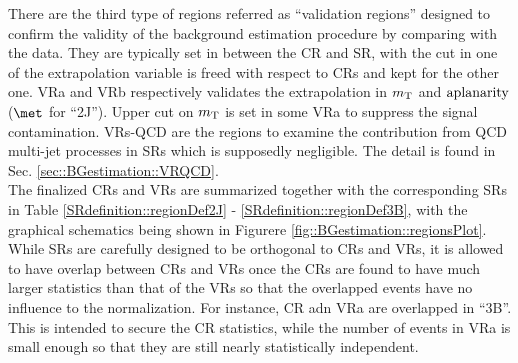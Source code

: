 There are the third type of regions referred as ``validation regions'' designed to confirm the validity of the background estimation procedure by comparing with the data. They are typically set in between the CR and SR, with the cut in one of the extrapolation variable is freed with respect to CRs and kept for the other one. VRa and VRb respectively validates the extrapolation in $m_{\mathrm{T}}$ and $\mathrm{aplanarity}$ ($\met$ for ``2J''). Upper cut on $m_{\mathrm{T}}$ is set in some VRa to suppress the signal contamination. VRs-QCD are the regions to examine the contribution from QCD multi-jet processes in SRs which is supposedly negligible. The detail is found in Sec. \ref{sec::BGestimation::VRQCD}. \\

The finalized CRs and VRs are summarized together with the corresponding SRs in Table \ref{SRdefinition::regionDef2J} - \ref{SRdefinition::regionDef3B}, with the graphical schematics being shown in Figurere \ref{fig::BGestimation::regionsPlot}. While SRs are carefully designed to be orthogonal to CRs and VRs, it is allowed to have overlap between CRs and VRs once the CRs are found to have much larger statistics than that of the VRs so that the overlapped events have no influence to the normalization. For instance, CR adn VRa are overlapped in ``3B''. This is intended to secure the CR statistics, while the number of events in VRa is small enough so that they are still nearly statistically independent. \\
\clearpage

